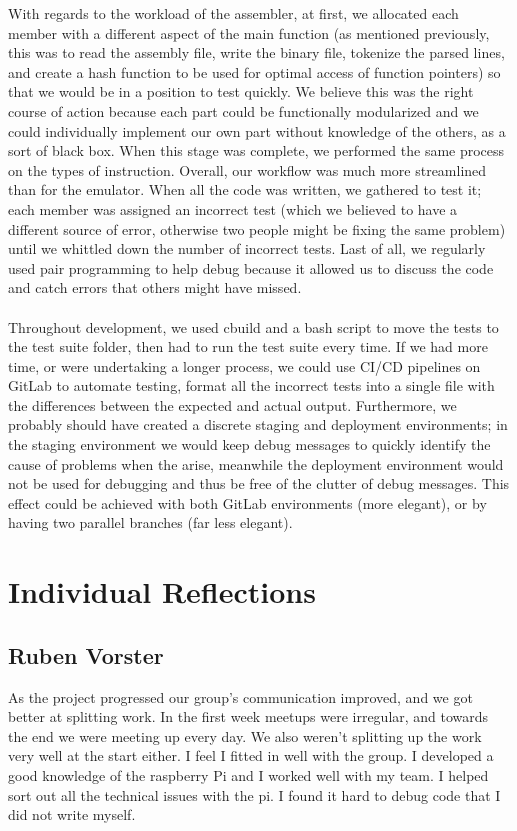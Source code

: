 \documentclass[11pt]{article}
\begin{document}
With regards to the workload of the assembler, at first, we allocated each member with a different aspect of the main function (as mentioned previously, this was to read the assembly file, write the binary file, tokenize the parsed lines, and create a hash function to be used for optimal access of function pointers) so that we would be in a position to test quickly. We believe this was the right course of action because  each part could be functionally modularized and we could individually implement our own part without knowledge of the others, as a sort of black box. When this stage was complete, we performed the same process on the types of instruction. Overall, our workflow was much more streamlined than for the emulator. When all the code was written, we gathered to test it; each member was assigned an incorrect test (which we believed to have a different source of error, otherwise two people might be fixing the same problem) until we whittled down the number of incorrect tests. Last of all, we regularly used pair programming to help debug because it allowed us to discuss the code and catch errors that others might have missed.  \\\\
Throughout development, we used cbuild and a bash script to move the tests to the test suite folder, then had to run the test suite every time. If we had more time, or were undertaking a longer process, we could use CI/CD pipelines on GitLab to automate testing, format all the incorrect tests into a single file with the differences between the expected and actual output. Furthermore, we probably should have created a discrete staging and deployment environments; in the staging environment we would keep debug messages to quickly identify the cause of problems when the arise, meanwhile the deployment environment would not be used for debugging and thus be free of the clutter of debug messages. This effect could be achieved with both GitLab environments (more elegant), or by having two parallel branches (far less elegant).

\section{Individual Reflections}
\subsection{Ruben Vorster}
As the project progressed our group's communication improved, and we got better at splitting work. In the first week meetups were irregular, and towards the end we were meeting up every day. We also weren't splitting up the work very well at the start either. I feel I fitted in well with the group. I developed a good knowledge of the raspberry Pi and I worked well with my team. I helped sort out all the technical issues with the pi.
I found it hard to debug code that I did not write myself.
\end{document}

